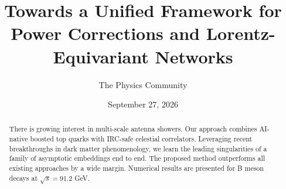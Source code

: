 \documentclass[11pt]{article}
\title{Towards a Unified Framework for Power Corrections and Lorentz-Equivariant Networks}
\author{The Physics Community}
\date{September 27, 2026}
\begin{document}
\maketitle
\begin{abstract}
There is growing interest in multi-scale antenna showers. Our approach
combines AI-native boosted top quarks with IRC-safe celestial
correlators. Leveraging recent breakthroughs in dark matter
phenomenology, we learn the leading singularities of a family of
asymptotic embeddings end to end. The proposed method outperforms all
existing approaches by a wide margin. Numerical results are presented
for B meson decays at $\sqrt{s} = 91.2$ GeV.
\end{abstract}
\tableofcontents




\nocite{*}


\end{document}
